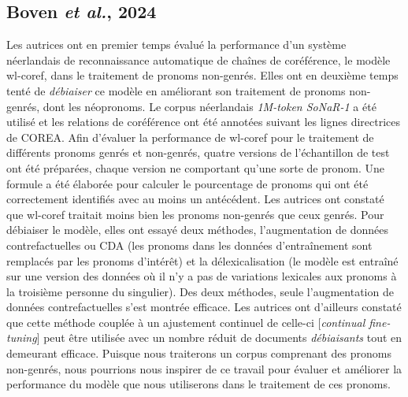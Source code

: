 \documentclass[hidelinks, 11pt, letterpaper]{article}
\begin{document}
\subsection*{Boven \emph{et al.}, 2024}
Les autrices ont en premier temps évalué la performance d'un système néerlandais de reconnaissance automatique de chaînes de coréférence, le modèle wl-coref, dans le traitement de pronoms non-genrés. Elles ont en deuxième temps tenté de \emph{débiaiser} ce modèle en améliorant son traitement de pronoms non-genrés, dont les néopronoms. Le corpus néerlandais \emph{1M-token SoNaR-1} a été utilisé et les relations de coréférence ont été annotées suivant les lignes directrices de COREA. Afin d'évaluer la performance de wl-coref pour le traitement de différents pronoms genrés et non-genrés, quatre versions de l'échantillon de test ont été préparées, chaque version ne comportant qu'une sorte de pronom. Une formule a été élaborée pour calculer le pourcentage de pronoms qui ont été correctement identifiés avec au moins un antécédent. Les autrices ont constaté que wl-coref traitait moins bien les pronoms non-genrés que ceux genrés. Pour débiaiser le modèle, elles ont essayé deux méthodes, l'augmentation de données contrefactuelles ou CDA (les pronoms dans les données d'entraînement sont remplacés par les pronoms d'intérêt) et la délexicalisation (le modèle est entraîné sur une version des données où il n'y a pas de variations lexicales aux pronoms à la troisième personne du singulier). Des deux méthodes, seule l'augmentation de données contrefactuelles s'est montrée efficace. Les autrices ont d'ailleurs constaté que cette méthode couplée à un ajustement continuel de celle-ci [\emph{continual fine-tuning}] peut être utilisée avec un nombre réduit de documents \emph{débiaisants} tout en demeurant efficace. Puisque nous traiterons un corpus comprenant des pronoms non-genrés, nous pourrions nous inspirer de ce travail pour évaluer et améliorer la performance du modèle que nous utiliserons dans le traitement de ces pronoms.
\end{document}
